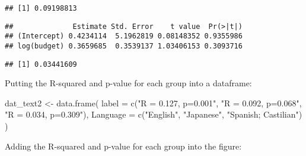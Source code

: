 \documentclass[
]{article}
\newenvironment{Shaded}{\begin{snugshade}}{\end{snugshade}}
\newcommand{\AttributeTok}[1]{\textcolor[rgb]{0.77,0.63,0.00}{#1}}
\newcommand{\DecValTok}[1]{\textcolor[rgb]{0.00,0.00,0.81}{#1}}
\newcommand{\FunctionTok}[1]{\textcolor[rgb]{0.00,0.00,0.00}{#1}}
\newcommand{\NormalTok}[1]{#1}
\newcommand{\OtherTok}[1]{\textcolor[rgb]{0.56,0.35,0.01}{#1}}
\newcommand{\SpecialCharTok}[1]{\textcolor[rgb]{0.00,0.00,0.00}{#1}}
\newcommand{\StringTok}[1]{\textcolor[rgb]{0.31,0.60,0.02}{#1}}
\begin{document}
\begin{verbatim}
## [1] 0.09198813
\end{verbatim}

\begin{Shaded}
\end{Shaded}

\begin{verbatim}
##              Estimate Std. Error    t value  Pr(>|t|)
## (Intercept) 0.4234114  5.1962819 0.08148352 0.9355986
## log(budget) 0.3659685  0.3539137 1.03406153 0.3093716
\end{verbatim}

\begin{Shaded}
\end{Shaded}

\begin{verbatim}
## [1] 0.03441609
\end{verbatim}

Putting the R-squared and p-value for each group into a dataframe:

\begin{Shaded}
\begin{Highlighting}[]
\NormalTok{dat\_text2 }\OtherTok{\textless{}{-}} \FunctionTok{data.frame}\NormalTok{(}
  \AttributeTok{label =} \FunctionTok{c}\NormalTok{(}\StringTok{"R = 0.127, p=0.001"}\NormalTok{, }\StringTok{"R = 0.092, p=0.068"}\NormalTok{, }\StringTok{"R = 0.034, p=0.309"}\NormalTok{),}
  \AttributeTok{Language   =} \FunctionTok{c}\NormalTok{(}\StringTok{"English"}\NormalTok{, }\StringTok{"Japanese"}\NormalTok{, }\StringTok{"Spanish; Castilian"}\NormalTok{)}
\NormalTok{)}
\end{Highlighting}
\end{Shaded}

Adding the R-squared and p-value for each group into the figure:
\end{document}
